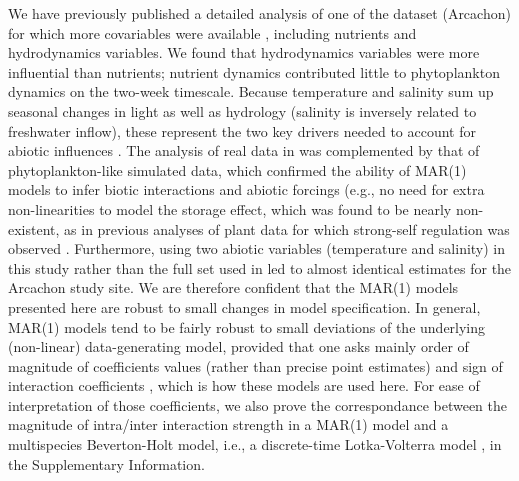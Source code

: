 \documentclass[10pt]{article}
\begin{document}
We have previously published a detailed analysis of one of the dataset
(Arcachon) for which more covariables were available \citep{barraquand_coastal_2018},
including nutrients and hydrodynamics variables. We found that hydrodynamics
variables were more influential than nutrients; nutrient dynamics
contributed little to phytoplankton dynamics on the two-week timescale.
Because temperature and salinity sum up seasonal changes in light
as well as hydrology (salinity is inversely related to freshwater
inflow), these represent the two key drivers needed to account for
abiotic influences \citep{scheef_inferring_2013}. The analysis
of real data in \citet{barraquand_coastal_2018}
was complemented by that of phytoplankton-like simulated data, which
confirmed the ability of MAR(1) models to infer biotic interactions
and abiotic forcings (e.g., no need for extra non-linearities to model
the storage effect, which was found to be nearly non-existent, as
in previous analyses of plant data for which strong-self regulation
was observed \citep{adler_coexistence_2010,ellner_how_2016, adler_competition_2018}.
Furthermore, using two abiotic variables (temperature and salinity)
in this study rather than the full set used in \citet{barraquand_coastal_2018}
led to almost identical estimates for the Arcachon study site.
We are therefore confident that the MAR(1) models presented here are
robust to small changes in model specification. In general, MAR(1)
models tend to be fairly robust to small deviations of the underlying
(non-linear) data-generating model, provided that one asks mainly
order of magnitude of coefficients values (rather than precise point
estimates) and sign of interaction coefficients \citep{certain_how_2018},
which is how these models are used here. For ease of interpretation
of those coefficients, we also prove the correspondance between the
magnitude of intra/inter interaction strength in a MAR(1) model and
a multispecies Beverton-Holt model, i.e., a discrete-time Lotka-Volterra
model \citep{cushing_discrete_2004} , in the Supplementary Information.
\end{document}
